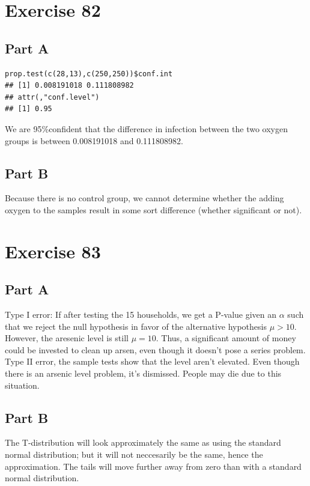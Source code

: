 \documentclass{article}\usepackage[]{graphicx}\usepackage[]{color}
\makeatletter
\newenvironment{kframe}{%
 \def\at@end@of@kframe{}%
 \ifinner\ifhmode%
  \def\at@end@of@kframe{\end{minipage}}%
  \begin{minipage}{\columnwidth}%
 \fi\fi%
 \def\FrameCommand##1{\hskip\@totalleftmargin \hskip-\fboxsep
 \colorbox{shadecolor}{##1}\hskip-\fboxsep
     \hskip-\linewidth \hskip-\@totalleftmargin \hskip\columnwidth}%
 \MakeFramed {\advance\hsize-\width
   \@totalleftmargin\z@ \linewidth\hsize
   \@setminipage}}%
 {\par\unskip\endMakeFramed%
 \at@end@of@kframe}
\newenvironment{knitrout}{}{} %
\makeatother
\begin{document}
\section*{Exercise 82}
\subsection*{Part A}
\begin{knitrout}
\color{fgcolor}\begin{kframe}
\begin{verbatim}
prop.test(c(28,13),c(250,250))$conf.int
## [1] 0.008191018 0.111808982
## attr(,"conf.level")
## [1] 0.95
\end{verbatim}
\end{kframe}
\end{knitrout}
We are 95\%confident that the difference in infection between the two oxygen groups is between 0.008191018 and 0.111808982.
\subsection*{Part B}
Because there is no control group, we cannot determine whether the adding oxygen to the samples result in some sort difference (whether significant or not).
\section*{Exercise 83}
\subsection*{Part A}
Type I error: If after testing the 15 households, we get a P-value given an $\alpha$ such that we reject the null hypothesis in favor of the alternative hypothesis $\mu>10$. However, the aresenic level is still $\mu=10$. Thus, a significant amount of money could be invested to clean up arsen, even though it doesn't pose a series problem.
Type II error, the sample tests show that the level aren't elevated. Even though there is an arsenic level problem, it's dismissed. People may die due to this situation.
\subsection*{Part B}
The T-distribution will look approximately the same as using the standard normal distribution; but it will not neccesarily be the same, hence the approximation. The tails will move further away from zero than with a standard normal distribution.
\end{document}
